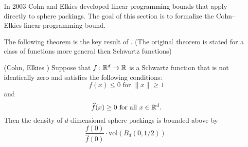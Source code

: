 In 2003 Cohn and Elkies \cite{ElkiesCohn}  developed  linear programming bounds that apply directly to sphere packings. The goal of this section is to formalize the Cohn--Elkies linear programming bound.

The following theorem is the key result of \cite{ElkiesCohn}. (The original theorem is stated for a   class of functions more general then Schwartz functions)
\begin{theorem}\label{thm:Cohn-Elkies}\notready
  (Cohn, Elkies \cite{ElkiesCohn}) Suppose that  $f:\mathbb{R}^d\to\mathbb{R}$ is a Schwartz function that is not identically zero and satisfies the following conditions:
  \begin{equation}\label{eqn:Cohn-Elkies-condition-1}f(x)\leq 0\mbox{ for } \|x\|\geq 1\end{equation} and
  \begin{equation}\label{eqn:Cohn-Elkies-condition-2}\widehat{f}(x)\geq0\mbox{ for all } x\in\mathbb{R}^d.\end{equation}
    Then the density of $d$-dimensional
    sphere packings is bounded above by $$\frac{f(0)}{\widehat{f}(0)}\cdot \mathrm{vol}(B_d(0,1/2)).$$
  \end{theorem}
